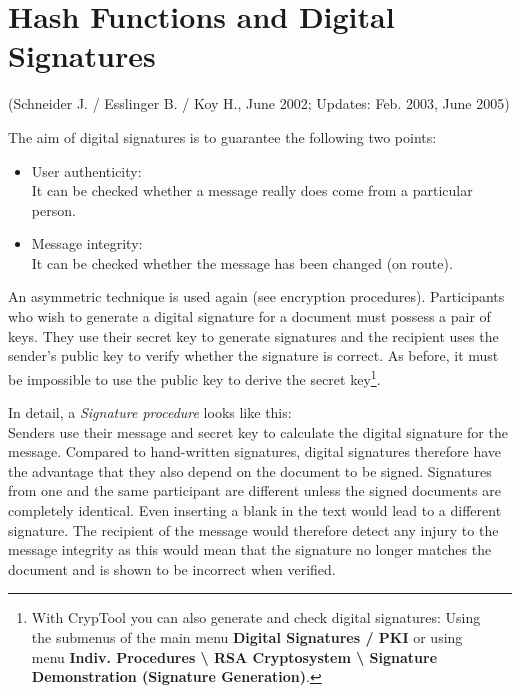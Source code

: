 
\newpage
\hypertarget{Chapter_Hashes-and-Digital-Signatures}{}
\section{Hash Functions and Digital Signatures}
\label{Chapter_Hashes-and-Digital-Signatures}
(Schneider J. / Esslinger B. / Koy H., June 2002;
Updates: Feb. 2003, June 2005)

\vspace{12pt}
The aim of digital signatures is to guarantee the following two points:
\begin{itemize}
 \item User authenticity:  \\
      It can be checked whether a message really does
come from a particular person.
 \item Message integrity:   \\
      It can be checked whether the message has been
changed (on route).
\end{itemize}


An asymmetric technique is used again (see encryption procedures). Participants
who wish to generate a digital signature for a document must possess a pair of
keys. They use their secret key to generate signatures and the recipient uses
the sender's public key to verify whether the signature is correct. As before,
it must be impossible to use the public key to derive the secret key\footnote{%
With CrypTool you can also generate and check 
digital signatures: Using\\
the submenus of the main menu {\bf Digital Signatures / PKI}  or using\\
menu {\bf Indiv. Procedures \textbackslash{} RSA Cryptosystem 
\textbackslash{} Signature Demonstration (Signature Generation)}.
}.


In detail, a  {\em Signature procedure} looks like
this: \\ Senders use their message and secret key to calculate the digital
signature for the message. Compared to hand-written signatures, digital
signatures therefore have the advantage that they also depend on the document to
be signed. Signatures from one and the same participant are different unless the
signed documents are completely identical. Even inserting a blank in the text
would lead to a different signature. The recipient of the message would
therefore detect any injury to the message integrity as this would mean that the
signature no longer matches the document and is shown to be incorrect when
verified.

